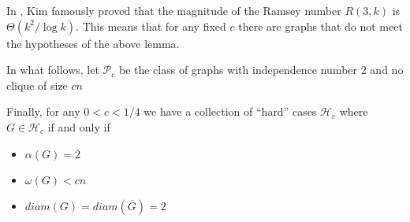 In \cite{MR1369063}, Kim famously proved that the magnitude of the Ramsey number $R(3,k)$ is $\Theta(k^2/\log k)$.  This means that for any fixed $c$ there are graphs that do not meet the hypotheses of the above lemma.  

In what follows, let $\mathcal{P}_c$ be the class of graphs with independence number 2 and no clique of size $cn$




Finally, for any $0 < c < 1/4$ we have a collection of ``hard'' cases $\mathcal{H}_c$ where $G \in \mathcal{H}_c$ if and only if
\begin{itemize}
	\item $\alpha(G) = 2$
	\item $\omega(G) < cn$
	\item $diam(G) = diam(\overline{G}) = 2$
\end{itemize}

%
